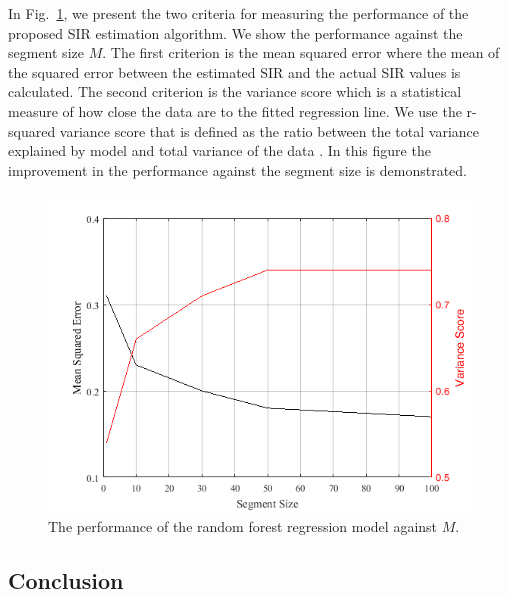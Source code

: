 In Fig.~\ref{ftml-conf:fig:prediction-error}, we present the two criteria for measuring the performance of the proposed SIR estimation algorithm. We show the performance against the segment size $M$. The first criterion is the mean squared error where the mean of the squared error between the estimated SIR and the actual SIR values is calculated. The second criterion is the variance score which is a statistical measure of how close the data are to the fitted regression line. We use the r-squared variance score that is defined as the ratio between the total variance explained by model and total variance of the data \cite{r-squared}. In this figure the improvement in the performance against the segment size is demonstrated. 

\begin{figure}[tbp]
 \centering
 \includegraphics[width=0.75\columnwidth]{./chapter-ftml/plots/prediction-error}
 \caption{The performance of the random forest regression model against $M$.}
 \label{ftml-conf:fig:prediction-error}
\end{figure}

\subsection{Conclusion}\label{ftml-conf:sec:conclusion}

